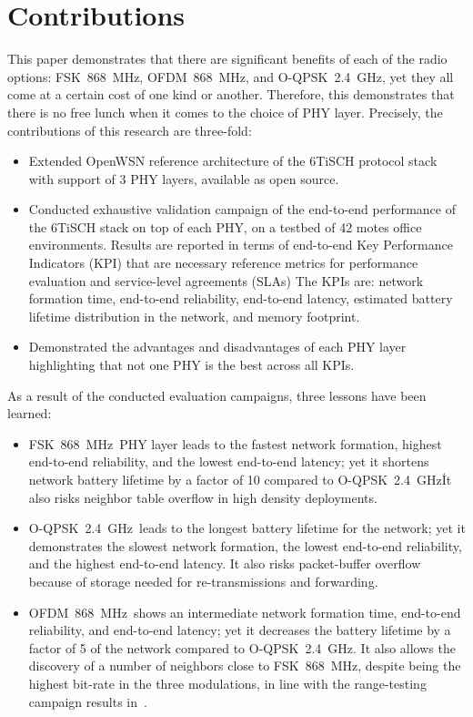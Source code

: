 \documentclass[journal,article,submit,moreauthors,pdftex]{Definitions/mdpi}
\newcommand{\fsk}          {FSK~868~MHz}
\newcommand{\oqpsk}        {O-QPSK~2.4~GHz}
\newcommand{\ofdm}         {OFDM~868~MHz}
\begin{document}
\section{Contributions}
\label{sec:contributions}

This paper demonstrates that there are significant benefits of each of the radio options: \fsk, \ofdm, and \oqpsk, yet they all come at a certain cost of one kind or another.
Therefore, this demonstrates that there is no free lunch when it comes to the choice of PHY layer.
Precisely, the contributions of this research are three-fold:

\begin{itemize}
    \item Extended OpenWSN reference architecture of the 6TiSCH protocol stack with support of 3 PHY layers, available as open source.
    \item Conducted exhaustive validation campaign of the end-to-end performance of the 6TiSCH stack on top of each PHY, on a testbed of 42 motes office environments.
        Results are reported in terms of end-to-end Key Performance Indicators (KPI) that are necessary reference metrics for performance evaluation and service-level agreements (SLAs)
        The KPIs are: 
            network formation time,
            end-to-end reliability,
            end-to-end latency, 
            estimated battery lifetime distribution in the network, and
            memory footprint.
    \item Demonstrated the advantages and disadvantages of each PHY layer highlighting that not one PHY is the best across all KPIs.
\end{itemize}

As a result of the conducted evaluation campaigns, three lessons have been learned:


\begin{itemize}
    \item \fsk\ PHY layer leads to the fastest network formation, highest end-to-end reliability, and the lowest end-to-end latency; yet it shortens network battery lifetime by a factor of 10 compared to \oqpsk\. 
        It also risks neighbor table overflow in high density deployments.
    \item \oqpsk\ leads to the longest battery lifetime for the network; yet it demonstrates the slowest network formation, the lowest end-to-end reliability, and the highest end-to-end latency.
        It also risks packet-buffer overflow because of storage needed for re-transmissions and forwarding.
    \item \ofdm\ shows an intermediate network formation time, end-to-end reliability, and end-to-end latency; yet  it decreases the battery lifetime by a factor of 5 of the network compared to \oqpsk.
    It also allows the discovery of a number of neighbors close to \fsk, despite being the highest bit-rate in the three modulations, in line with the range-testing campaign results in~\cite{munoz18evaluationa}. 
\end{itemize}
\end{document}
